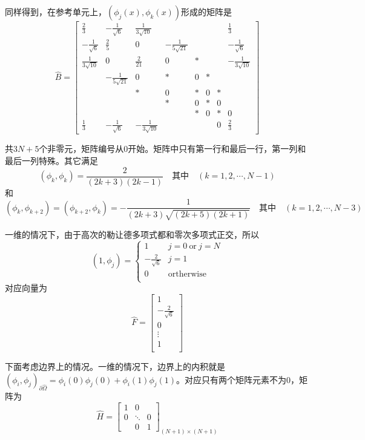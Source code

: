 \documentclass[UTF8,12pt]{article}
\begin{document}
同样得到，在参考单元上，$(\phi_j(x), \phi_k(x))$形成的矩阵是
\begin{equation}
\hat{B} = \left[ \begin{array}{cccccccc}
\frac23 & -\frac{1}{\sqrt{6}} & \frac{1}{3\sqrt{10}} &  &  &  &  & \frac13 \\ 
-\frac{1}{\sqrt{6}} & \frac25 & 0 & -\frac{1}{5\sqrt{21}} &  &  &  & -\frac{1}{\sqrt{6}} \\ 
\frac{1}{3\sqrt{10}} & 0 & \frac{2}{21} & 0 & * &  &  & -\frac{1}{3\sqrt{10}} \\ 
& -\frac{1}{5\sqrt{21}} & 0 & * & 0 & * &  &  \\ 
&  & * & 0 & * & 0 & * &  \\ 
&  &  & * & 0 & * & 0 &  \\ 
&  &  &  & * & 0 & * & 0 \\ 
\frac13 & -\frac{1}{\sqrt{6}} & -\frac{1}{3\sqrt{10}} &  &  &  & 0 & \frac23
\end{array}  \right]
\end{equation}

共$3N+5$个非零元，矩阵编号从0开始。矩阵中只有第一行和最后一行，第一列和最后一列特殊。其它满足
$$ (\phi_k, \phi_k) = \frac{2}{(2k+3)(2k-1)} \quad \text{其中} \quad (k = 1, 2, \cdots, N-1) $$
和
$$ (\phi_{k}, \phi_{k+2}) = (\phi_{k+2}, \phi_{k}) = -\frac{1}{(2k+3)\sqrt{(2k+5)(2k+1)}} \quad \text{其中} \quad (k = 1, 2, \cdots, N-3) $$

一维的情况下，由于高次的勒让德多项式都和零次多项式正交，所以
\begin{equation}
(1, \phi_j) = \left\{ \begin{array}{ll}
1 & j = 0 \ \text{or} \ j = N \\
-\frac{2}{\sqrt{6}} & j = 1 \\
0 & \text{ortherwise} \\
\end{array}  \right.
\end{equation}
对应向量为
\begin{equation}
\hat{F} = \left[ \begin{array}{c}
1 \\
-\frac{2}{\sqrt{6}} \\
0 \\
\vdots \\
1 \\
\end{array} \right]
\end{equation}

下面考虑边界上的情况。一维的情况下，边界上的内积就是$(\phi_i, \phi_j)_{\partial\hat{\Omega}} = \phi_i(0) \phi_j(0) + \phi_i(1) \phi_j(1)$。对应只有两个矩阵元素不为0，矩阵为
\begin{equation}
\hat{H} = \left[ \begin{array}{ccc}
1 & 0 &  \\ 
0 & \ddots & 0 \\ 
& 0 & 1
\end{array} \right]_{(N+1) \times (N+1)}
\end{equation}
\end{document}
